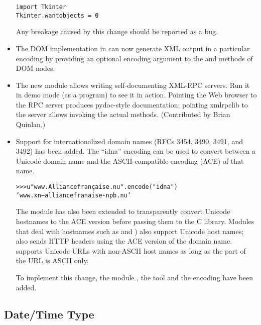 \documentclass{howto}
\begin{document}
\begin{itemize}
\begin{verbatim}
import Tkinter
Tkinter.wantobjects = 0
\end{verbatim}

Any breakage caused by this change should be reported as a bug.

\item The DOM implementation
in  can now generate XML output in a
particular encoding by providing an optional encoding argument to
the  and  methods of DOM nodes.

\item The new  module allows writing
self-documenting XML-RPC servers. Run it in demo mode (as a program)
to see it in action.   Pointing the Web browser to the RPC server
produces pydoc-style documentation; pointing xmlrpclib to the
server allows invoking the actual methods.
(Contributed by Brian Quinlan.)

\item Support for internationalized domain names (RFCs 3454, 3490,
3491, and 3492) has been added. The ``idna'' encoding can be used
to convert between a Unicode domain name and the ASCII-compatible
encoding (ACE) of that name.

\begin{alltt}
>>> u"www.Alliancefran\c{c}aise.nu".encode("idna")
'www.xn--alliancefranaise-npb.nu'
\end{alltt}

The  module has also been extended to transparently
convert Unicode hostnames to the ACE version before passing them to
the C library.  Modules that deal with hostnames such as
 and ) also support Unicode host names;
 also sends HTTP  headers using the ACE
version of the domain name.   supports Unicode URLs
with non-ASCII host names as long as the  part of the URL
is ASCII only.

To implement this change, the module , the tool
 and the  encoding have been added.  

\end{itemize}


\subsection{Date/Time Type}
\end{document}
